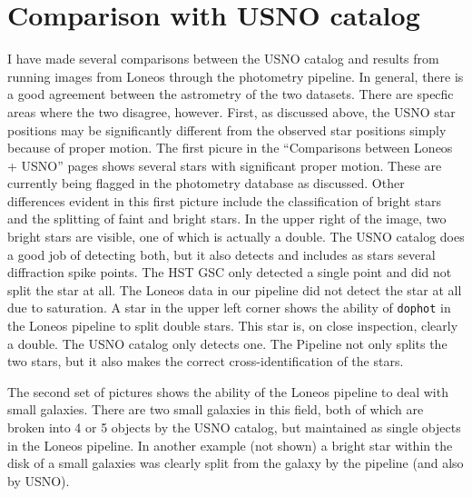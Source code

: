 \documentclass{article}
\begin{document}
\section {Comparison with USNO catalog}

I have made several comparisons between the USNO catalog and results
from running images from Loneos through the photometry pipeline.  In
general, there is a good agreement between the astrometry of the two
datasets.  There are specfic areas where the two disagree, however.
First, as discussed above, the USNO star positions may be
significantly different from the observed star positions simply
because of proper motion.  The first picure in the ``Comparisons
between Loneos + USNO'' pages shows several stars with significant
proper motion.  These are currently being flagged in the photometry
database as discussed.  Other differences evident in this first
picture include the classification of bright stars and the splitting
of faint and bright stars.  In the upper right of the image, two
bright stars are visible, one of which is actually a double.  The USNO
catalog does a good job of detecting both, but it also detects and
includes as stars several diffraction spike points.  The HST GSC only
detected a single point and did not split the star at all.  The Loneos
data in our pipeline did not detect the star at all due to saturation.
A star in the upper left corner shows the ability of {\tt dophot} in
the Loneos pipeline to split double stars.  This star is, on close
inspection, clearly a double.  The USNO catalog only detects one.  The
Pipeline not only splits the two stars, but it also makes the correct
cross-identification of the stars.  

The second set of pictures shows the ability of the Loneos pipeline to
deal with small galaxies.  There are two small galaxies in this field,
both of which are broken into 4 or 5 objects by the USNO catalog, but
maintained as single objects in the Loneos pipeline.  In another
example (not shown) a bright star within the disk of a small galaxies
was clearly split from the galaxy by the pipeline (and also by USNO).

\appendix
\end{document}
